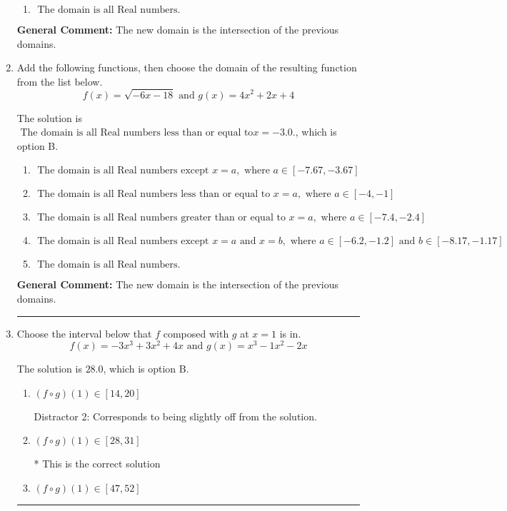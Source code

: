 \documentclass{extbook}[14pt]
\newcommand{\litem}[1]{\item #1

\rule{\textwidth}{0.4pt}}
\begin{document}
\begin{enumerate}
{\begin{enumerate}[label=\Alph*.]
\item \( \text{ The domain is all Real numbers. } \)


\end{enumerate}

\textbf{General Comment:} The new domain is the intersection of the previous domains.
}
\litem{
Add the following functions, then choose the domain of the resulting function from the list below.
\[ f(x) = \sqrt{-6x-18}  \text{ and } g(x) = 4x^{2} +2 x + 4 \]

The solution is \( \text{ The domain is all Real numbers less than or equal to} x = -3.0. \), which is option B.\begin{enumerate}[label=\Alph*.]
\item \( \text{ The domain is all Real numbers except } x = a, \text{ where } a \in [-7.67, -3.67] \)


\item \( \text{ The domain is all Real numbers less than or equal to } x = a, \text{ where } a \in [-4, -1] \)


\item \( \text{ The domain is all Real numbers greater than or equal to } x = a, \text{ where } a \in [-7.4, -2.4] \)


\item \( \text{ The domain is all Real numbers except } x = a \text{ and } x = b, \text{ where } a \in [-6.2, -1.2] \text{ and } b \in [-8.17, -1.17] \)


\item \( \text{ The domain is all Real numbers. } \)


\end{enumerate}

\textbf{General Comment:} The new domain is the intersection of the previous domains.
}
\litem{
Choose the interval below that $f$ composed with $g$ at $x=1$ is in.
\[ f(x) = -3x^{3} +3 x^{2} +4 x \text{ and } g(x) = x^{3} -1 x^{2} -2 x \]

The solution is \( 28.0 \), which is option B.\begin{enumerate}[label=\Alph*.]
\item \( (f \circ g)(1) \in [14, 20] \)

 Distractor 2: Corresponds to being slightly off from the solution.
\item \( (f \circ g)(1) \in [28, 31] \)

* This is the correct solution
\item \( (f \circ g)(1) \in [47, 52] \)


\end{enumerate}}
\end{enumerate}
\end{document}
